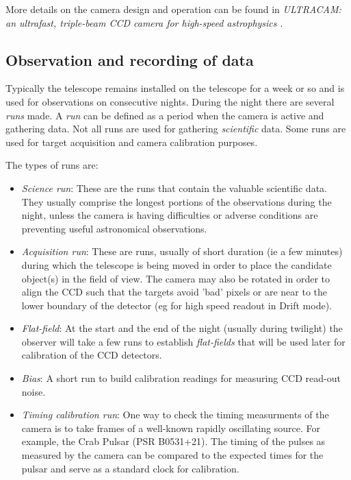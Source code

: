 \documentclass[a4paper,10pt]{article}
\begin{document}
More details on the camera design and operation can be found in \emph{ULTRACAM: an ultrafast, triple-beam CCD camera for high-speed
astrophysics \cite{dhillon07}}.

\subsection{Observation and recording of data}

Typically the telescope remains installed on the telescope for a week or so and is used for observations on consecutive nights. During the night there are several \emph{runs} made. A \emph{run} can be defined as a period when the camera is active and gathering data. Not all runs are used for gathering \emph{scientific} data. Some runs are used for target acquisition and camera calibration purposes. 

The types of runs are: 
\begin{itemize}
	\item \emph{Science run}: These are the runs that contain the valuable scientific data. They usually comprise the longest portions of the observations during the night, unless the camera is having difficulties or adverse conditions are preventing useful astronomical observations.
	\item \emph{Acquisition run}: These are runs, usually of short duration (ie a few minutes) during which the telescope is being moved in order to place the candidate object(s) in the field of view. The camera may also be rotated in order to align the CCD such that the targets avoid 'bad' pixels or are near to the lower boundary of the detector (eg for high speed readout in Drift mode). 
	\item \emph{Flat-field}: At the start and the end of the night (usually during twilight) the observer will take a few runs to establish \emph{flat-fields} that will be used later for calibration of the CCD detectors.  
	\item \emph{Bias}: A short run to build calibration readings for measuring CCD read-out noise. 
	\item \emph{Timing calibration run}: One way to check the timing measurments of the camera is to take frames of a well-known rapidly oscillating source. For example, the Crab Pulsar (PSR B0531+21). The timing of the pulses as measured by the camera can be compared to the expected times for the pulsar and serve as a standard clock for calibration.
\end{itemize}
\end{document}
